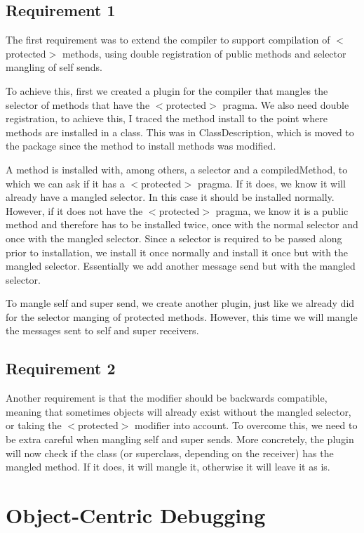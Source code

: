\documentclass[a4paper]{article}
\begin{document}
\subsection{Requirement 1}
The first requirement was to extend the compiler to support compilation of
$<$protected$>$ methods, using double registration of public methods and selector
mangling of self sends.\par
To achieve this, first we created a plugin for the compiler that mangles the
selector of methods that have the $<$protected$>$ pragma.
We also need double registration, to achieve this, I traced the method install to the point
where methods are installed in a class. This was in ClassDescription, which is
moved to the package since the method to install methods was modified.
\par
A method is installed with, among
others, a selector and a compiledMethod, to which we can ask if it has a
$<$protected$>$ pragma. If it does, we know it will already have a mangled
selector. In this case it should be installed normally.
However, if it does not have the $<$protected$>$ pragma, we know it is a public
method and therefore has to be installed twice, once with the normal selector
and once with the mangled selector. Since a selector is required to be passed
along prior to installation, we install it once normally and install it once but
with the mangled selector. Essentially we add another message send but with the
mangled selector.
\par
To mangle self and super send, we create another plugin, just like we already
did for the selector manging of protected methods. However, this time we will
mangle the messages sent to self and super receivers.
\subsection{Requirement 2}
Another requirement is that the modifier should be backwards compatible, meaning
that sometimes objects will already exist without the mangled selector, or
taking the $<$protected$>$ modifier into account. To overcome this, we need to
be extra careful when mangling self and super sends. More concretely, the plugin
will now check if the class (or superclass, depending on the receiver) has the
mangled method. If it does, it will mangle it, otherwise it will leave it as is.
\section{Object-Centric Debugging}
\end{document}
